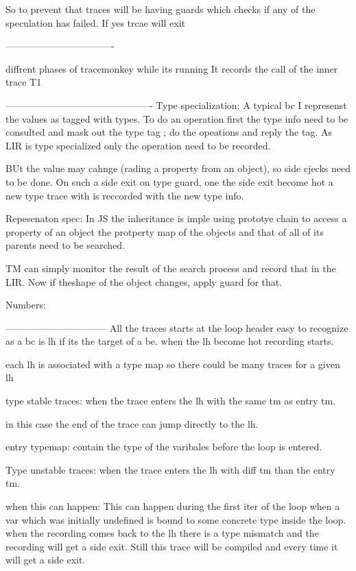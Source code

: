 So to prevent that traces will be having guards which checks
if any of the speculation has failed. If yes trcae will exit

----------------------------------

diffrent phases of tracemonkey while its running
It records the call of the inner trace T1

----------------------------------------------
Type specialization:
A typical bc I represenst the values as tagged with types.
To do an operation first the type info need to be consulted and
mask out the type tag ; do the opeations and reply the tag.
As LIR is type specialized only the operation need to be recorded.

BUt the value may cahnge (rading a property from an object),
    so side cjecks need to be done. On such a side exit on type guard,
    one the side exit become hot a new type trace with is 
    reccorded with the new type info.


Repesenaton spec:
In JS the inheritance is imple using prototye chain
to access a property of an object the
protperty map of the objects and that of all of its parents need to be
searched.

TM can simply monitor the result of the search process and record that in the LIR.
Now if theshape of the object changes, apply guard for that.

Numbers:


--------------------------------
All the traces starts at the loop header
easy to recognize as a bc is lh if its the target of a be.
when the lh become hot recording starts.

each lh is associated with a type map so there could be many
traces for a given lh

type stable traces: when the trace enters the lh with the same tm
as entry tm. 

in this case the end of the trace can jump directly to the lh.

entry typemap: contain the type of the varibales before the loop
is entered.

Type unstable traces:
when the trace enters the lh with diff tm than the entry tm. 

when this can happen: This can happen during the first iter of the 
loop when a var which was initially undefined is bound to some concrete type inside
the loop. when the recording comes back to the lh there is a type mismatch
and the recording will get  a side exit. Still this trace will be compiled 
and every time it will get a side exit.

